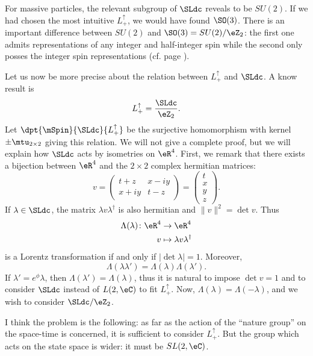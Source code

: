 For massive particles, the relevant subgroup of $\SLdc$ reveals to be $SU(2)$. If we had chosen the most intuitive $L_+^{\uparrow}$, we would have found $\SO(3)$. There is an important difference between $SU(2)$ and $\SO(3)=SU(2)/\eZ_2$: the first one admits representations of any integer and half-integer spin while the second only posses the integer spin representations (cf. page \pageref{pg:reprez_SO3}).

Let us now be more precise about the relation between $L_+^{\uparrow}$ and $\SLdc$. A know result is
\[
   L_+^{\uparrow}=\frac{\SLdc}{\eZ_2}.
\]
Let $\dpt{\mSpin}{\SLdc}{L_+^{\uparrow}}$ be the surjective homomorphism with kernel $\pm\mtu_{2\times 2}$ giving this relation.
We will not give a complete proof, but we will explain how $\SLdc$ acts by isometries on $\eR^4$. First, we remark that there exists a bijection between $\eR^4$ and the $2\times 2$ complex hermitian matrices:
\begin{equation}
  v=\begin{pmatrix} t+z & x-iy\\x+iy&t-z\end{pmatrix}=\begin{pmatrix}t\\x\\y\\z\end{pmatrix}.
\end{equation}
If $\lambda\in\SLdc$, the matrix $\lambda v\lambda^{\dag}$ is also hermitian and $\|v\|^2=\det v$. Thus 
\begin{equation}
\begin{aligned}
 \Lambda(\lambda)  \colon \eR^4&\to \eR^4 \\ 
   v&\mapsto \lambda v\lambda^{\dag} 
\end{aligned}
\end{equation}
is a Lorentz transformation if and only if $|\det\lambda|=1$. Moreover,
\[
     \Lambda(\lambda\lambda')=\Lambda(\lambda)\Lambda(\lambda').
\]
If $\lambda'=e^{\phi}\lambda$, then $\Lambda(\lambda')=\Lambda(\lambda)$, thus it is natural to impose $\det v=1$ and to consider $\SLdc$ instead of $L(2,\eC)$ to fit $L_+^{\uparrow}$. Now, $\Lambda(\lambda)=\Lambda(-\lambda)$, and we wish to consider $\SLdc/\eZ_2$.

I think the problem is the following: as far as the action of the ``nature group''{} on the space-time is concerned, it is sufficient to consider $L_+^{\uparrow}$. But the group which acts on the state space is wider: it must be $SL(2,\eC)$.

